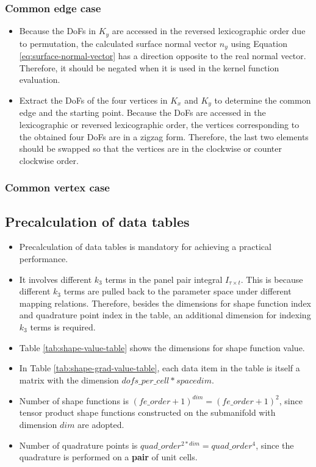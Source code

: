 \documentclass[11pt, a4paper]{article}
\begin{document}
\subsubsection{Common edge case}

\begin{itemize}
\item Because the DoFs in $K_y$ are accessed in the reversed lexicographic order due to permutation,
  the calculated surface normal vector $n_y$ using Equation \eqref{eq:surface-normal-vector} has a
  direction opposite to the real normal vector. Therefore, it should be negated when it is used in
  the kernel function evaluation.
\item Extract the DoFs of the four vertices in $K_x$ and $K_y$ to determine the common edge and the
  starting point. Because the DoFs are accessed in the lexicographic or reversed lexicographic
  order, the vertices corresponding to the obtained four DoFs are in a zigzag form. Therefore, the
  last two elements should be swapped so that the vertices are in the clockwise or counter clockwise
  order.
\end{itemize}

\subsubsection{Common vertex case}

\subsection{Precalculation of data tables}

\begin{itemize}
\item Precalculation of data tables is mandatory for achieving a practical performance.
\item It involves different $k_3$ terms in the panel pair integral $I_{\tau\times t}$. This is
  because different $k_3$ terms are pulled back to the parameter space under different mapping
  relations. Therefore, besides the dimensions for shape function index and quadrature point index
  in the table, an additional dimension for indexing $k_3$ terms is required.
\item Table \ref{tab:shape-value-table} shows the dimensions for shape function value.
\item In Table \ref{tab:shape-grad-value-table}, each data item in the table is itself a matrix with
  the dimension $dofs\_per\_cell*spacedim$.
\item Number of shape functions is $(fe\_order+1)^{dim}=(fe\_order+1)^{2}$, since tensor product shape functions
  constructed on the submanifold with dimension $dim$ are adopted.
\item Number of quadrature points is $quad\_order^{2*dim}=quad\_order^{4}$, since the quadrature is
  performed on a \textbf{pair} of unit cells.
\end{itemize}
\end{document}

